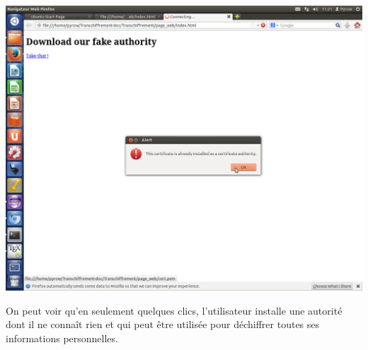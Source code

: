 \documentclass[a4paper,11pt,french]{book}
\begin{document}
\includegraphics[width=\textwidth]{images/Alerte.png}

On peut voir qu'en seulement quelques clics, l'utilisateur installe une autorité dont il ne connaît rien et qui peut être utilisée pour déchiffrer toutes ses informations personnelles. 
\newpage
\end{document}
